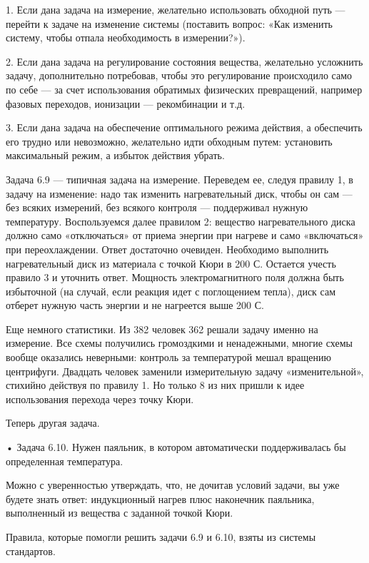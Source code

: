 1.  Если дана  задача на  измерение, желательно  использовать обходной
путь — перейти  к задаче на изменение системы  (поставить вопрос: «Как
изменить систему, чтобы отпала необходимость в измерении?»).

2. Если  дана задача  на регулирование состояния  вещества, желательно
усложнить  задачу, дополнительно  потребовав, чтобы  это регулирование
происходило само по себе —  за счет использования обратимых физических
превращений, например  фазовых переходов,  ионизации —  рекомбинации и
т.д.

3. Если  дана задача  на обеспечение  оптимального режима  действия, а
обеспечить его трудно или  невозможно, желательно идти обходным путем:
установить максимальный режим, а избыток действия убрать.

Задача  6.9  — типичная  задача  на  измерение. Переведем  ее,  следуя
правилу 1,  в задачу  на изменение:  надо так  изменить нагревательный
диск,  чтобы он  сам  —  без всяких  измерений,  без всякого  контроля
—  поддерживал нужную  температуру.  Воспользуемся  далее правилом  2:
вещество  нагревательного диска  должно само  «отключаться» от  приема
энергии  при нагреве  и  само «включаться»  при переохлаждении.  Ответ
достаточно  очевиден.  Необходимо  выполнить  нагревательный  диск  из
материала с точкой Кюри в 200 С. Остается учесть правило 3 и уточнить
ответ.  Мощность электромагнитного  поля  должна  быть избыточной  (на
случай,  если реакция  идет  с поглощением  тепла),  диск сам  отберет
нужную часть энергии и не нагреется выше 200 С.

Еще немного  статистики. Из  382 человек 362  решали задачу  именно на
измерение.  Все схемы  получились  громоздкими  и ненадежными,  многие
схемы  вообще  оказались  неверными: контроль  за  температурой  мешал
вращению  центрифуги. Двадцать  человек заменили  измерительную задачу
«изменительной», стихийно  действуя по правилу  1. Но только 8  из них
пришли к идее использования перехода через точку Кюри.

Теперь другая задача.


• Задача 6.10. Нужен  паяльник, в котором автоматически поддерживалась
бы определенная температура.

Можно с  уверенностью утверждать, что,  не дочитав условий  задачи, вы
уже будете знать ответ: индукционный нагрев плюс наконечник паяльника,
выполненный из вещества с заданной точкой Кюри.

Правила, которые  помогли решить задачи  6.9 и 6.10, взяты  из системы
стандартов.

